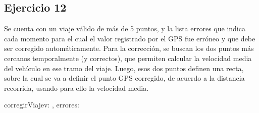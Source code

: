 \documentclass[a4paper]{article}
\begin{document}
\pagebreak

\subsection{Ejercicio 12}

Se cuenta con un viaje válido de más de 5 puntos, y la lista errores que indica cada momento para el cual el valor registrado por el GPS fue erróneo y que debe ser corregido automáticamente. Para la corrección, se buscan los dos puntos más cercanos temporalmente (y correctos), que permiten calcular la velocidad media del vehículo en ese tramo del viaje. Luego, esos dos puntos definen una recta, sobre la cual se va a definir el punto GPS corregido, de acuerdo a la distancia recorrida, usando para ello la velocidad media.

\begin{proc}{corregirViaje}{\Inout v: \viaje, \In errores: \TLista{\tiempo}}{}{
    \\
    \\




        
}
\end{proc}
\end{document}
